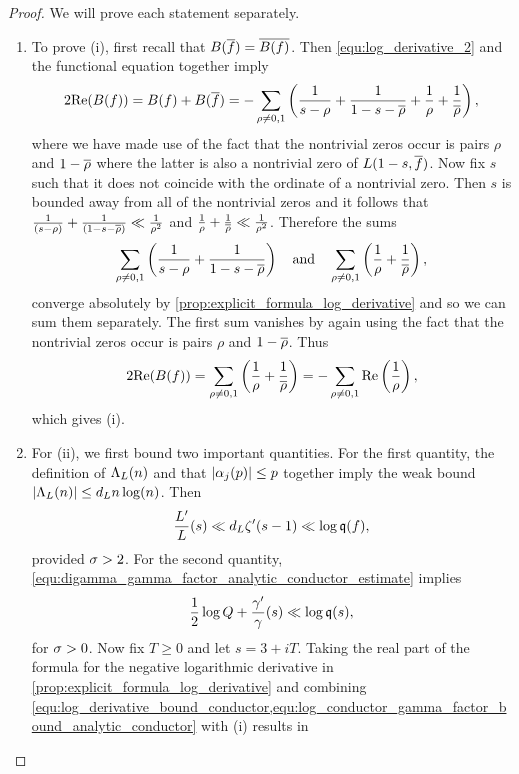 \documentclass[12pt]{article}
\begin{document}
    \begin{proof}
      We will prove each statement separately.
      \begin{enumerate}[label*=(\roman*)]
        \item To prove (i), first recall that  \(B(\overline{f}) = \overline{B(f)}\). Then \cref{equ:log_derivative_2} and the functional equation together imply
        \[
          2\mathrm{Re}(B(f)) = B(f)+B(\overline{f}) = -\sum_{\rho \neq 0,1}\left(\frac{1}{s-\rho}+\frac{1}{1-s-\overline{\rho}}+\frac{1}{\rho}+\frac{1}{\overline{\rho}}\right),
        \]
        where we have made use of the fact that the nontrivial zeros occur is pairs \(\rho\) and \(1-\overline{\rho}\) where the latter is also a nontrivial zero of \(L(1-s,\overline{f})\). Now fix \(s\) such that it does not coincide with the ordinate of a nontrivial zero. Then \(s\) is bounded away from all of the nontrivial zeros and it follows that \(\frac{1}{(s-\rho)}+\frac{1}{(1-s-\overline{\rho})} \ll \frac{1}{\rho^{2}}\) and \(\frac{1}{\rho}+\frac{1}{\overline{\rho}} \ll \frac{1}{\rho^{2}}\). Therefore the sums
        \[
          \sum_{\rho \neq 0,1}\left(\frac{1}{s-\rho}+\frac{1}{1-s-\overline{\rho}}\right) \quad \text{and} \quad \sum_{\rho \neq 0,1}\left(\frac{1}{\rho}+\frac{1}{\overline{\rho}}\right),
        \]
        converge absolutely by \cref{prop:explicit_formula_log_derivative} and so we can sum them separately. The first sum vanishes by again using the fact that the nontrivial zeros occur is pairs \(\rho\) and \(1-\overline{\rho}\). Thus
        \[
          2\mathrm{Re}(B(f)) = \sum_{\rho \neq 0,1}\left(\frac{1}{\rho}+\frac{1}{\overline{\rho}}\right) = -\sum_{\rho \neq 0,1}\mathrm{Re}\left(\frac{1}{\rho}\right),
        \]
        which gives (i).
        \item For (ii), we first bound two important quantities. For the first quantity, the definition of \(\Lambda_{L}(n)\) and that \(|\alpha_{j}(p)| \le p\) together imply the weak bound \(|\Lambda_{L}(n)| \le d_{L}n\log(n)\). Then
        \begin{equation}\label{equ:log_derivative_bound_conductor}
          \frac{L'}{L}(s) \ll d_{L}\zeta'(s-1) \ll \log{\mathfrak{q}(f)},
        \end{equation}
        provided \(\sigma > 2\). For the second quantity, \cref{equ:digamma_gamma_factor_analytic_conductor_estimate} implies
        \begin{equation}\label{equ:log_conductor_gamma_factor_bound_analytic_conductor}
          \frac{1}{2}\log{Q}+\frac{\gamma'}{\gamma}(s) \ll \log{\mathfrak{q}(s)},
        \end{equation}
        for \(\sigma > 0\). Now fix \(T \ge 0\) and let \(s = 3+iT\). Taking the real part of the formula for the negative logarithmic derivative in \cref{prop:explicit_formula_log_derivative} and combining \cref{equ:log_derivative_bound_conductor,equ:log_conductor_gamma_factor_bound_analytic_conductor} with (i) results in

\end{enumerate}
\end{proof}
\end{document}
